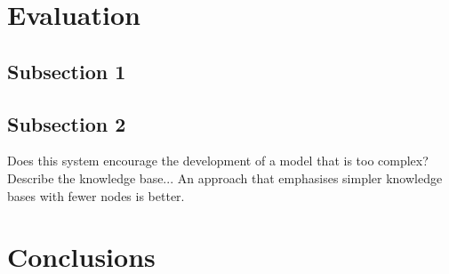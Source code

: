 
\section{Evaluation}





\subsection{Subsection 1}


\subsection{Subsection 2}

Does this system encourage the development of a model that is too complex? Describe the knowledge base... An approach that emphasises simpler knowledge bases with fewer nodes is better.

\section{Conclusions}

